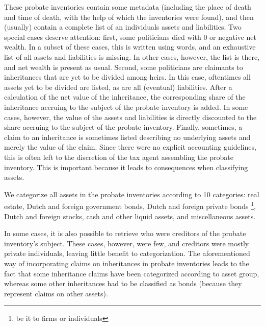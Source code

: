 These probate inventories contain some metadata (including the place of death and time of death, with the help of which the inventories were found), and then (usually) contain a complete list of an individuals assets and liabilities. Two special cases deserve attention: first, some politicians died with 0 or negative net wealth. In a subset of these cases, this is written using words, and an exhaustive list of all assets and liabilities is missing. In other cases, however, the list is there, and net wealth is present as usual. Second, some politicians are claimants to inheritances that are yet to be divided among heirs. In this case, oftentimes all assets yet to be divided are listed, as are all (eventual) liabilities. After a calculation of the net value of the inheritance, the corresponding share of the inheritance accruing to the subject of the probate inventory is added. In some cases, however, the value of the assets and liabilities is directly discounted to the share accruing to the subject of the probate inventory. Finally, sometimes, a claim to an inheritance is sometimes listed describing no underlying assets and merely the value of the claim. Since there were no explicit accounting guidelines, this is often left to the discretion of the tax agent assembling the probate inventory. This is important because it leads to consequences when classifying assets. 

We categorize all assets in the probate inventories according to 10 categories: real estate, Dutch and foreign government bonds, Dutch and foreign private bonds \footnote{be it to firms or individuals}, Dutch and foreign stocks, cash and other liquid assets, and miscellaneous assets. 

In some cases, it is also possible to retrieve who were creditors of the probate inventory's subject. These cases, however, were few, and creditors were mostly private individuals, leaving little benefit to categorization. The aforementioned way of incorporating claims on inheritances in probate inventories leads to the fact that some inheritance claims have been categorized according to asset group, whereas some other inheritances had to be classified as bonds (because they represent claims on other assets). 

